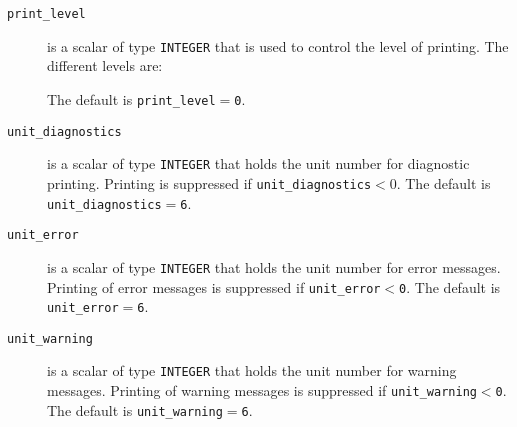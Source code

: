 \documentclass{spral}
\begin{document}
\begin{description}

\item[\texttt{print\_level}] is a scalar of type  {\tt INTEGER}
that is used to control the level of printing. The different levels are:
The default is {\tt print\_level$=$\tt 0}.

\item[\texttt{unit\_diagnostics}] is a scalar  of type
{\tt INTEGER} that holds the
unit number for diagnostic printing. Printing is suppressed if
{\tt unit\_diagnostics$<0$}.
The default is {\tt unit\_diagnostics$=$6}.

\item[\texttt{unit\_error}] is a scalar of type  {\tt INTEGER} that holds the
unit number for error messages.
Printing of error messages
is suppressed if {\tt unit\_error$<$0}.
The default is {\tt unit\_error$=$6}.

\item[\texttt{unit\_warning}] is a scalar  of type  {\tt INTEGER} that holds the
unit number for warning messages.
Printing of warning messages is suppressed if {\tt unit\_warning$<$0}.
The default is {\tt unit\_warning$=$6}.

\end{description}



\end{document}
